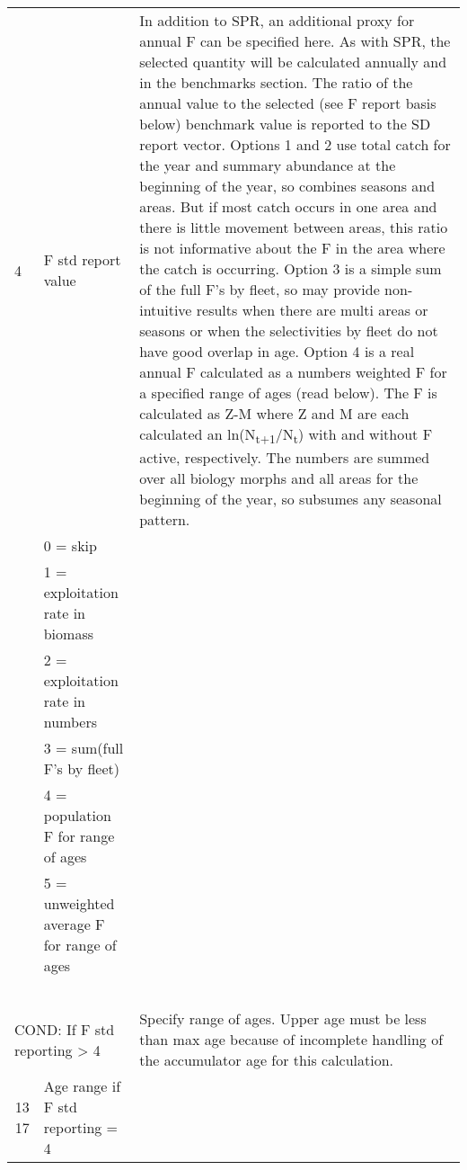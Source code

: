 {\begin{landscape}
\begin{longtable}{p{1.5cm} p{7cm} p{12.5cm}}
 \hline 
 4 & F std report value &  \multirow{1}{1cm}[-0.25cm]{\parbox{12.5cm}{In addition to SPR, an additional proxy for annual F can be specified here.  As with SPR, the selected quantity will be calculated annually and in the benchmarks section.  The ratio of the annual value to the selected (see F report basis below) benchmark value is reported to the SD report vector.  Options 1 and 2 use total catch for the year and summary abundance at the beginning of the year, so combines seasons and areas.  But if most catch occurs in one area and there is little movement between areas, this ratio is not informative about the F in the area where the catch is occurring.  Option 3 is a simple sum of the full F’s by fleet, so may provide non-intuitive results when there are multi areas or seasons or when the selectivities by fleet do not have good overlap in age.  Option 4 is a real annual F calculated as a numbers weighted F for a specified range of ages (read below).  The F is calculated as Z-M where Z and M are each calculated an ln(N\textsubscript{t+1}/N\textsubscript{t}) with and without F active, respectively. The numbers are summed over all biology morphs and all areas for the beginning of the year, so subsumes any seasonal pattern.}}\Tstrut\\
   & 0 = skip & \\
   & 1 = exploitation rate in biomass & \\
   & 2 = exploitation rate in numbers & \\
   & 3 = sum(full F's by fleet) & \\
   & 4 = population F for range of ages & \\
   & 5 = unweighted average F for range of ages & \\
   & & \\
   & & \\
   & & \\
   & & \\
   & & \\ 
  
 \hline
 \multicolumn{2}{l}{COND: If F std reporting > 4 } & \multirow{1}{1cm}[-0.25cm]{\parbox{12.5cm}{Specify range of ages. Upper age must be less than max age because of incomplete handling of the accumulator age for this calculation.}} \Tstrut\\

 \multicolumn{1}{r}{13 17}  & Age range if F std reporting = 4 & \Tstrut\\


\end{longtable}
\end{landscape}}
